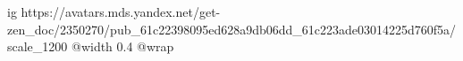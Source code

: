  
 
 
 
 

\ifcmt
  ig https://avatars.mds.yandex.net/get-zen_doc/2350270/pub_61c22398095ed628a9db06dd_61c223ade03014225d760f5a/scale_1200
  @width 0.4
  @wrap 
\fi
